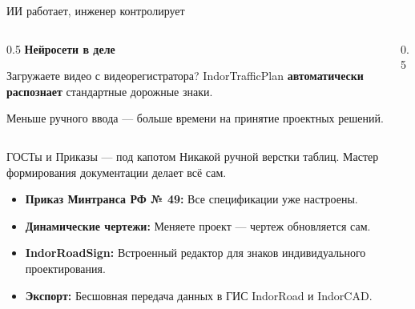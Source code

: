\documentclass[aspectratio=169]{beamer}
\newcommand{\hl}[1]{\textcolor{AccentDrive}{\textbf{#1}}}
\newcommand{\tech}[1]{\textcolor{AccentFresh}{\textbf{#1}}}
\begin{document}
\begin{frame}{ИИ работает, инженер контролирует}
    \begin{columns}
        \begin{column}{0.5\textwidth}
            \vspace{0.5cm}
            \Large \hl{Нейросети в деле}
            \vspace{0.5cm}
            \normalsize
            
            Загружаете видео с видеорегистратора? 
            IndorTrafficPlan \tech{автоматически распознает} стандартные дорожные знаки.
            
            \vspace{0.5cm}
            Меньше ручного ввода — больше времени на принятие проектных решений.
        \end{column}
        \begin{column}{0.5\textwidth}
            \begin{center}
            \end{center}
        \end{column}
    \end{columns}
\end{frame}

\begin{frame}{ГОСТы и Приказы — под капотом}
    \Large
    Никакой ручной верстки таблиц. Мастер формирования документации делает всё сам.
    
    \vspace{0.8cm}
    \normalsize
    \begin{itemize}
        \item \hl{Приказ Минтранса РФ № 49:} Все спецификации уже настроены.
        \item \hl{Динамические чертежи:} Меняете проект — чертеж обновляется сам.
        \item \hl{IndorRoadSign:} Встроенный редактор для знаков индивидуального проектирования.
        \item \hl{Экспорт:} Бесшовная передача данных в ГИС IndorRoad и IndorCAD.
    \end{itemize}
\end{frame}
\end{document}
